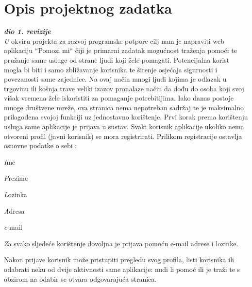 \chapter{Opis projektnog zadatka}
		
		\textbf{\textit{dio 1. revizije}}\\
		
		\textit U okviru projekta za razvoj programske potpore cilj nam je napraviti web aplikaciju 
“Pomozi mi“ čiji je primarni zadatak mogućnost traženja pomoći te pružanje same usluge od strane ljudi koji žele pomagati. Potencijalna korist mogla bi biti i samo zbližavanje korisnika te širenje osjećaja sigurnosti i povezanosti same zajednice. Na ovaj način mnogi ljudi kojima je odlazak u trgovinu ili košnja trave veliki izazov pronalaze način da dođu do osoba koji svoj višak vremena žele iskoristiti za pomaganje potrebitijima. Iako danas postoje mnoge društvene mreže, ova stranica nema nepotreban sadržaj te je maksimalno prilagođena svojoj funkciji uz jednostavno korištenje. \newline
Prvi korak prema korištenju usluga same aplikacije je prijava u sustav.
Svaki korisnik aplikacije ukoliko nema otvoreni profil (javni korisnik) se mora registrirati. Prilikom registracije ostavlja osnovne podatke o sebi :

		\begin{packed_item}
			\item \textit Ime
			\item \textit Prezime
			\item \textit Lozinka
			\item \textit Adresa
			\item \textit e-mail
		\end{packed_item}
		
		\textit Za svako sljedeće korištenje dovoljna je prijava pomoću e-mail adrese i lozinke.

Nakon prijave korisnik može pristupiti pregledu svog profila, listi korisnika ili odabrati neku od dvije aktivnosti same aplikacije: nudi li pomoć ili je traži te s obzirom na odabir se otvara odgovarajuća stranica. 

		\eject

